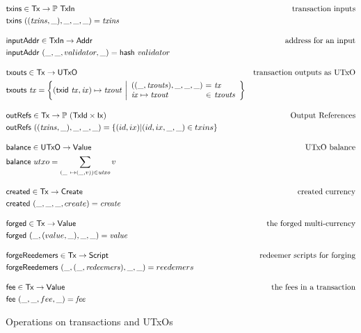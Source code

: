 \documentclass[11pt,a4paper]{article}
\newcommand{\powerset}[1]{\mathbb{P}~#1}
\newcommand{\var}[1]{\mathit{#1}}
\newcommand{\fun}[1]{\mathsf{#1}}
\newcommand{\type}[1]{\mathsf{#1}}
\newcommand{\Script}{\type{Script}}
\newcommand{\TxId}{\type{TxId}}
\newcommand{\Ix}{\type{Ix}}
\newcommand{\Addr}{\type{Addr}}
\newcommand{\Value}{\type{Value}}
\newcommand{\TxIn}{\type{TxIn}}
\newcommand{\UTxO}{\type{UTxO}}
\newcommand{\Create}{\type{Create}}
\newcommand{\Tx}{\type{Tx}}
\newcommand{\hash}[1]{\fun{hash}\ \var{#1}}
\begin{document}
\begin{figure}
\begin{align*}
& \fun{txins} \in \Tx \to \powerset{\TxIn}
& \text{transaction inputs} \\
& \fun{txins} ~ ((\var{txins}, \_), \_, \_, \_) = \var{txins}
\\[1em]
& \fun{inputAddr} \in \TxIn \to \Addr
& \text{address for an input} \\
& \fun{inputAddr} ~ (\_, \_, validator, \_)
= \hash validator
\\[1em]
& \fun{txouts} \in \Tx \to \UTxO
& \text{transaction outputs as UTxO} \\
& \fun{txouts} ~ \var{tx} =
  \left\{ (\fun{txid} ~ \var{tx}, \var{ix}) \mapsto \var{txout} ~
  \middle| \begin{array}{l@{~}c@{~}l}
             ((\_, \var{txouts}),\_, \_, \_) & = & \var{tx} \\
             \var{ix} \mapsto \var{txout} & \in & \var{txouts}
           \end{array}
  \right\}
\\[1em]
& \fun{outRefs} \in \Tx \to \powerset({\TxId \times \Ix})
& \text{Output References} \\
& \fun{outRefs} ~ ((\var{txins}, \_), \_, \_, \_)
= \left\{ (id, ix) \middle| (id, ix, \_, \_) \in txins\right\}
\\[1em]
& \fun{balance} \in \UTxO \to \Value
& \text{UTxO balance} \\
& \fun{balance} ~ utxo = \sum_{(\_ ~ \mapsto (\_, v)) \in \var{utxo}} v
\\[1em]
& \fun{created} \in \Tx \to \Create
& \text{created currency} \\
& \fun{created} ~ (\_, \_, \_, create) = \var{create}
\\[1em]
& \fun{forged} \in \Tx \to \Value
& \text{the forged multi-currency} \\
& \fun{forged} ~ (\_, (value, \_), \_, \_) = \var{value}
\\[1em]
& \fun{forgeReedemers} \in \Tx \to \Script
& \text{redeemer scripts for forging} \\
& \fun{forgeReedemers} ~ ( \_, (\_, \var{redeemers}), \_, \_) = reedemers
\\[1em]
& \fun{fee} \in \Tx \to \Value
& \text{the fees in a transaction} \\
& \fun{fee} ~ (\_, \_, fee, \_) = \var{fee}
\end{align*}
\caption{Operations on transactions and UTxOs}
\label{fig:auxiliary_ops}
\end{figure}
\end{document}
